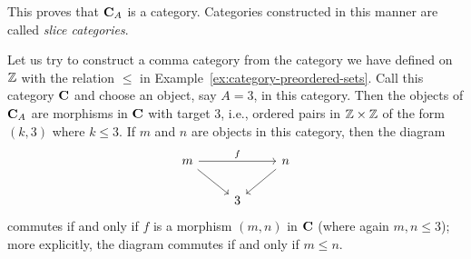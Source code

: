 \begin{example}
    This proves that \(\mathbf{C}_A\) is a category. Categories constructed in
    this manner are called \emph{slice categories}.

    Let us try to construct a comma category from the category we have defined
    on \(\mathbb{Z}\) with the relation \(\leq\) in
    Example~\ref{ex:category-preordered-sets}. Call this category \(\mathbf{C}\)
    and choose an object, say \(A = 3\), in this category. Then the objects of
    \(\mathbf{C}_A\) are morphisms in \(\mathbf{C}\) with target \(3\), i.e.,
    ordered pairs in \(\mathbb{Z} \times \mathbb{Z}\) of the form \((k, 3)\) where \(k \leq 3\).
    If \(m\) and \(n\) are objects in this category, then the diagram
    \[
        \begin{tikzcd}
            m \arrow[rd] \arrow[rr, "f"] &   & n \arrow[ld] \\
                                         & 3 &             
            \end{tikzcd}
    \]
    commutes if and only if \(f\) is a morphism \((m, n)\) in \(\mathbf{C}\)
    (where again \(m, n \leq 3\)); more explicitly, the diagram commutes if and
    only if \(m \leq n\).
\end{example}

